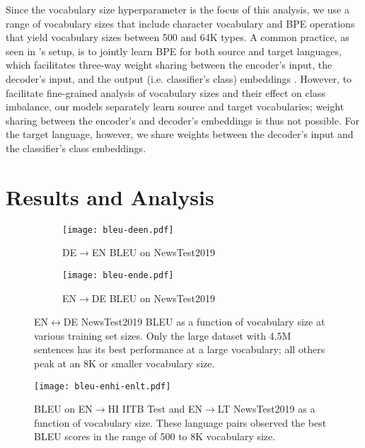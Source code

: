 Since the vocabulary size hyperparameter is the focus of this analysis, we use a range of vocabulary sizes that include character vocabulary and BPE operations that yield vocabulary sizes between 500 and 64K types.
A common practice, as seen in \citet{vaswani2017attention}'s setup, is to jointly learn BPE for both source and target languages, which facilitates three-way weight sharing between the encoder's input, the decoder's input, and the output (i.e. classifier's class) embeddings \cite{press-wolf-2017-embeddings}.
However, to facilitate fine-grained analysis of vocabulary sizes and their effect on class imbalance, our models separately learn source and target vocabularies; weight sharing between the encoder's and decoder's embeddings is thus not possible.
For the target language, however, we share weights between the decoder's input and the classifier's class embeddings.

\section{Results and Analysis}
\label{sec:nmt_analysis}
\begin{figure}[ht]
\begin{subfigure}{\linewidth}
    \centering
    \texttt{[image: bleu-deen.pdf]}
    \caption{DE$\rightarrow$EN BLEU on NewsTest2019}
    \label{fig:bleu-deen}
\end{subfigure}
\begin{subfigure}{\linewidth}
    \centering
    \texttt{[image: bleu-ende.pdf]}
    \caption{EN$\rightarrow$DE BLEU on NewsTest2019}
    \label{fig:bleu-ende}
\end{subfigure}
\caption{EN$\leftrightarrow$DE NewsTest2019 BLEU as a function of vocabulary size at various training set sizes. 
Only the large dataset with 4.5M sentences has its best performance at a large vocabulary; all others peak at an 8K or smaller vocabulary size.}
\label{fig:bleu-ende-deen}
\end{figure}

\begin{figure}[ht]
    \centering    
    \texttt{[image: bleu-enhi-enlt.pdf]}
    \caption{BLEU on EN$\rightarrow$HI IITB Test and EN$\rightarrow$LT NewsTest2019 as a function of vocabulary size.
    These language pairs observed the best BLEU scores in the range of 500 to 8K vocabulary size.}
    \label{fig:bleu-enhilt}
\end{figure}


